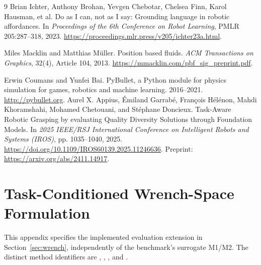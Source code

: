 \documentclass{article}
\begin{document}
\begin{thebibliography}{9}
Brian Ichter, Anthony Brohan, Yevgen Chebotar, Chelsea Finn, Karol Hausman, et al.
Do as I can, not as I say: Grounding language in robotic affordances.
In \emph{Proceedings of the 6th Conference on Robot Learning}, PMLR 205:287--318, 2023.
\url{https://proceedings.mlr.press/v205/ichter23a.html}.

Miles Macklin and Matthias M\"uller.
Position based fluids.
\emph{ACM Transactions on Graphics}, 32(4), Article 104, 2013.
\url{https://mmacklin.com/pbf_sig_preprint.pdf}.

Erwin Coumans and Yunfei Bai.
PyBullet, a Python module for physics simulation for games, robotics and machine learning.
2016--2021.
\url{http://pybullet.org}.
Aurel X. Appius, \'Emiland Garrab\'e, Fran\c{c}ois H\'el\'enon, Mahdi Khoramshahi, Mohamed Chetouani, and St\'ephane Doncieux.
Task-Aware Robotic Grasping by evaluating Quality Diversity Solutions through Foundation Models.
In \emph{2025 IEEE/RSJ International Conference on Intelligent Robots and Systems (IROS)}, pp. 1035--1040, 2025.
\url{https://doi.org/10.1109/IROS60139.2025.11246636}. Preprint: \url{https://arxiv.org/abs/2411.14917}.

\end{thebibliography}

\clearpage
\appendix
{}
\section{Task-Conditioned Wrench-Space Formulation}
\label{app:wrench}
This appendix specifies the implemented evaluation extension in Section~\ref{sec:wrench}, independently of the benchmark's surrogate M1/M2. The distinct method identifiers are , , , and .
\end{document}
